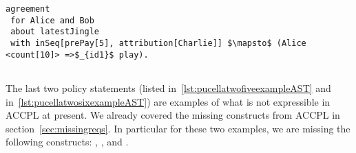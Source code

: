 \lstset{language=Pucella2006}
\begin{minipage}[c]{0.95\textwidth}
\begin{lstlisting}[frame=single, caption={Agreement of Example 2.6}, label={lst:pucellatwosixexampleAST}, mathescape]
agreement
 for Alice and Bob 
 about latestJingle 
 with inSeq[prePay[5], attribution[Charlie]] $\mapsto$ (Alice <count[10]> =>$_{id1}$ play). 
                                    
\end{lstlisting}
\end{minipage} 

The last two policy statements (listed in~\ref{lst:pucellatwofiveexampleAST} and in~\ref{lst:pucellatwosixexampleAST}) are examples of what is not expressible in \ac{ACCPL} at present. We already covered the missing constructs from \ac{ACCPL} in section~\ref{sec:missingreqs}. In particular for these two examples, we are missing the following constructs: , ,  and .


